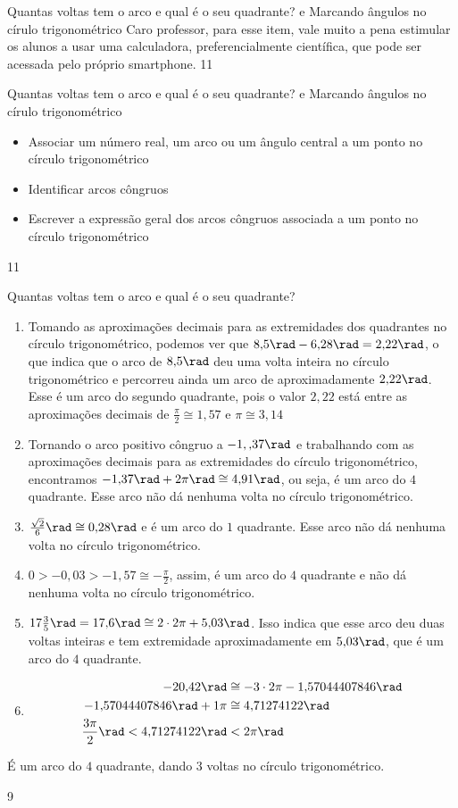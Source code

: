 \begin{sugestions}{Quantas voltas tem o arco e qual é o seu quadrante?  e Marcando ângulos no círulo trigonométrico}
{
	Caro professor, para esse item, vale muito a pena estimular os alunos a usar uma calculadora, preferencialmente científica, que pode ser acessada pelo próprio smartphone.
}{1}{1}
\end{sugestions}
\begin{objectives}{Quantas voltas tem o arco e qual é o seu quadrante?  e Marcando ângulos no círulo trigonométrico}
{
	\begin{itemize}
	\item Associar um número real, um arco ou um ângulo central a um ponto no círculo trigonométrico
	\item Identificar arcos côngruos
	\item Escrever a expressão geral dos arcos côngruos associada a um ponto no círculo trigonométrico
	\end{itemize}
}
{1}{1}
\end{objectives}
\begin{answer}{Quantas voltas tem o arco e qual é o seu quadrante?}
{
\begin{enumerate}
\item Tomando as aproximações decimais para as extremidades dos quadrantes no círculo trigonométrico, podemos ver que $8{,}5\rad - 6{,}28\rad = 2{,}22\rad$, o que indica que o arco de $8{,}5\rad$ deu uma volta inteira no círculo trigonométrico e percorreu ainda um arco de aproximadamente $2{,}22\rad$. Esse é um arco do segundo quadrante, pois o valor $2{,}22$ está entre as aproximações decimais de $\frac{\pi}{2}\cong1{,}57$ e $\pi\cong3{,}14$
\item Tornando o arco positivo côngruo a $-1,{,}37\rad$ e trabalhando com as aproximações decimais para as extremidades do círculo trigonométrico, encontramos $-1{,}37\rad+2\pi\rad \cong 4{,}91\rad$, ou seja, é um arco do $4$ quadrante. Esse arco não dá nenhuma volta no círculo trigonométrico.
\item $\frac{\sqrt{2}}{6}\rad\cong0{,}28\rad$ e é um arco do $1$ quadrante. Esse arco não dá nenhuma volta no círculo trigonométrico.
\item $0>-0{,}03>-1{,}57\cong-\frac{\pi}{2}$, assim, é um arco do $4$ quadrante e não dá nenhuma volta no círculo trigonométrico.
\item $17\frac{3}{5}\rad=17{,}6\rad\cong2\cdot2\pi+5{,}03\rad$. Isso indica que esse arco deu duas voltas inteiras e tem extremidade aproximadamente em $5{,}03\rad$, que é um arco do $4$ quadrante.
\item 
\begin{align*}
-20{,}42\rad&\cong-3\cdot2\pi-1{,}57044407846\rad \\
-1{,}57044407846\rad+1\pi&\cong4{,}71274122\rad\\
\frac{3\pi}{2}\rad<4{,}71274122\rad&<2\pi\rad
\end{align*}
\end{enumerate}
É um arco do $4$ quadrante, dando $3$ voltas no círculo trigonométrico.
}{9}
\end{answer}
